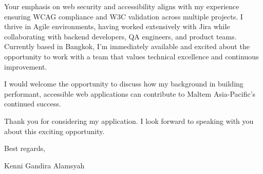\documentclass[12pt]{article}
\begin{document}
\vspace{0.3cm}

Your emphasis on web security and accessibility aligns with my experience ensuring WCAG compliance and W3C validation across multiple projects. I thrive in Agile environments, having worked extensively with Jira while collaborating with backend developers, QA engineers, and product teams. Currently based in Bangkok, I'm immediately available and excited about the opportunity to work with a team that values technical excellence and continuous improvement.

\vspace{0.3cm}

I would welcome the opportunity to discuss how my background in building performant, accessible web applications can contribute to Maltem Asia-Pacific's continued success.

\vspace{0.3cm}

Thank you for considering my application. I look forward to speaking with you about this exciting opportunity.

\vspace{0.5cm}

Best regards,

\vspace{0.2cm}

Kenni Gandira Alamsyah
\end{document}
